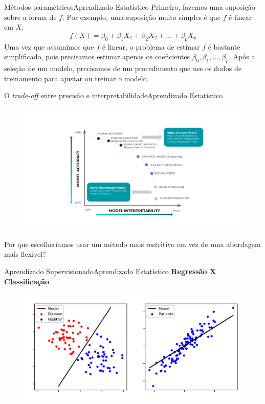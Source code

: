 \documentclass[t]{beamer}
\begin{document}

\begin{ftst}{Métodos paramétricos}{{Aprendizado Estatístico}}
\justifying
Primeiro, fazemos uma suposição sobre a forma de $f$. Por exemplo, uma suposição muito simples é que $f$ é linear em $X$:
\begin{equation}
    f(X) = \beta_0 + \beta_1 X_1 + \beta_2 X_2 + \ldots + \beta_p X_p
\end{equation}
\vone
Uma vez que assumimos que $f$ é linear, o problema de estimar $f$ é bastante simplificado, pois precisamos estimar apenas os coeficientes $\beta_0, \beta_1, ..., \beta_p$.
\vone
Após a seleção de um modelo, precisamos de um procedimento que use os dados de treinamento para ajustar ou treinar o modelo.

\end{ftst}


\begin{ftst}{O \textit{trade-off} entre precisão e interpretabilidade}{{Aprendizado Estatístico}}
\begin{figure}
    \centering
    \includegraphics[trim=120 60 80 80,clip,scale=0.4]{Figuras/slide03_10.png}
\end{figure}
\small
Por que escolheríamos usar um método mais restritivo em vez de uma abordagem mais flexível?
\end{ftst}


\begin{ftst}{Aprendizado Supervisionado}{{Aprendizado Estatístico}}
\textbf{Regressão X Classificação}
\begin{figure}
    \centering
    \includegraphics[scale=0.25]{Figuras/slide03_11.png}
\end{figure}
\end{ftst}
\end{document}
